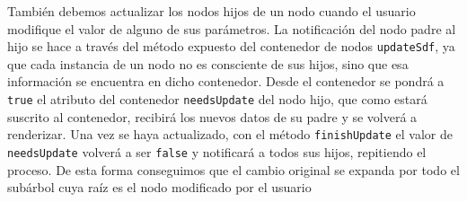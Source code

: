 También debemos actualizar los nodos hijos de un nodo cuando el usuario modifique el valor de alguno de sus parámetros. La notificación del nodo padre al hijo se hace a través del método expuesto del contenedor de nodos \texttt{updateSdf}, ya que cada instancia de un nodo no es consciente de sus hijos, sino que esa información se encuentra en dicho contenedor. Desde el contenedor se pondrá a \texttt{true} el atributo del contenedor \texttt{needsUpdate} del nodo hijo, que como estará suscrito al contenedor, recibirá los nuevos datos de su padre y se volverá a renderizar. Una vez se haya actualizado, con el método \texttt{finishUpdate} el valor de \texttt{needsUpdate} volverá a ser \texttt{false} y notificará a todos sus hijos, repitiendo el proceso. De esta forma conseguimos que el cambio original se expanda por todo el subárbol cuya raíz es el nodo modificado por el usuario\newline

